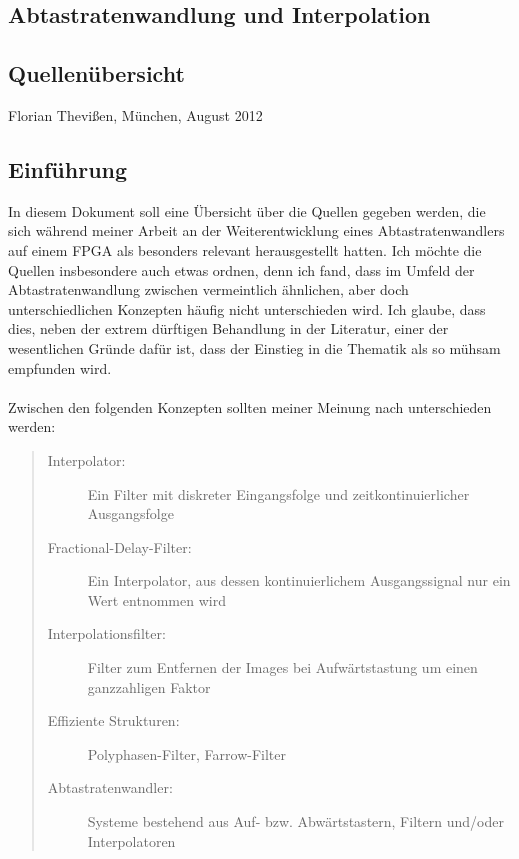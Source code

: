 \documentclass[11pt]{article}
\begin{document}

%

\setlength{\parindent}{0ex}

\begin{center}
\section*{Abtastratenwandlung und Interpolation}
\subsection*{Quellenübersicht}
Florian Thevißen, München, August 2012
\end{center}
\vspace{.5cm}

\subsection*{Einführung}

In diesem Dokument soll eine Übersicht über die Quellen gegeben werden, die sich während meiner Arbeit an der Weiterentwicklung
eines Abtastratenwandlers auf einem FPGA als besonders relevant herausgestellt hatten. Ich möchte die Quellen insbesondere auch etwas
ordnen, denn ich fand, dass im Umfeld der Abtastratenwandlung zwischen vermeintlich ähnlichen, aber doch unterschiedlichen
Konzepten häufig nicht unterschieden wird. Ich glaube, dass dies, neben der extrem dürftigen Behandlung in der Literatur, einer 
der wesentlichen Gründe dafür ist, dass der Einstieg in die Thematik als so mühsam empfunden wird. \\
\\
Zwischen den folgenden Konzepten sollten meiner Meinung nach unterschieden werden:

\begin{quote}\begin{description}
	\item[Interpolator:] Ein Filter mit diskreter Eingangsfolge und zeitkontinuierlicher Ausgangsfolge
	\item[Fractional-Delay-Filter:] Ein Interpolator, aus dessen kontinuierlichem Ausgangssignal nur ein Wert entnommen wird  
	\item[Interpolationsfilter:] Filter zum Entfernen der Images bei Aufwärtstastung um einen ganzzahligen Faktor
	\item[Effiziente Strukturen:] Polyphasen-Filter, Farrow-Filter 
	\item[Abtastratenwandler:] Systeme bestehend aus Auf- bzw. Abwärtstastern, Filtern und/oder Interpolatoren
\end{description} \end{quote} 
\end{document}

